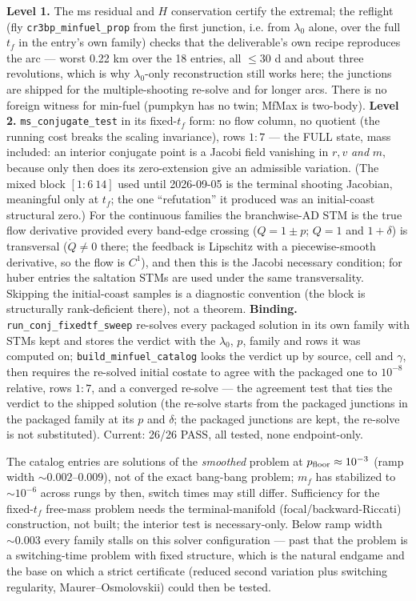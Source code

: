 \documentclass[11pt]{article}
\newcommand{\tf}{t_f}\newcommand{\R}{\mathbb{R}}
\newcommand{\file}[1]{\texttt{#1}}
\begin{document}
\begin{rig}
\textbf{Level 1.} The ms residual and $H$ conservation certify the extremal;
the reflight (fly \file{cr3bp\_minfuel\_prop} from the first junction, i.e. from $\lambda_0$ alone, over the full $\tf$ in the entry's own family) checks that the deliverable's own recipe reproduces the arc --- worst 0.22 km over the 18 entries, all $\le30$ d and about three revolutions, which is why $\lambda_0$-only reconstruction still works here; the junctions are shipped for the multiple-shooting re-solve and for longer arcs. There is no foreign witness for min-fuel (pumpkyn has no twin;
MfMax is two-body). \textbf{Level 2.} \file{ms\_conjugate\_test} in its
fixed-$\tf$ form: no flow column, no quotient (the running cost breaks the
scaling invariance), rows $1{:}7$ --- the FULL state, mass included: an interior
conjugate point is a Jacobi field vanishing in $r,v$ \emph{and} $m$, because only
then does its zero-extension give an admissible variation. (The mixed block
$[1{:}6\ 14]$ used until 2026-09-05 is the terminal shooting Jacobian, meaningful
only at $\tf$; the one ``refutation'' it produced was an initial-coast
structural zero.) For the continuous families the branchwise-AD STM is the
true flow derivative provided every band-edge crossing ($Q=1\pm p$; $Q=1$ and $1+\delta$) is transversal ($\dot Q\neq0$ there; the feedback is Lipschitz with a piecewise-smooth derivative, so the flow is $C^1$), and then this is the Jacobi necessary condition; for huber entries the saltation STMs are used under the same transversality. Skipping the initial-coast samples is a diagnostic convention (the block is structurally rank-deficient there), not a theorem.
\textbf{Binding.} \file{run\_conj\_fixedtf\_sweep} re-solves every packaged
solution in its own family with STMs kept and stores the verdict with the
$\lambda_0$, $p$, family and rows it was computed on; \file{build\_minfuel\_catalog} looks the verdict up by source, cell and $\gamma$, then requires the re-solved initial costate to agree with the packaged one to $10^{-8}$ relative, rows $1{:}7$, and a converged re-solve --- the agreement test that ties the verdict to the shipped solution (the re-solve starts from the packaged junctions in the packaged family at its $p$ and $\delta$; the packaged junctions are kept, the re-solve is not substituted). Current: 26/26 PASS, all
tested, none endpoint-only.
\end{rig}
\begin{warn}
The catalog entries are solutions of the \emph{smoothed} problem at
$p_{\rm floor}\approx10^{-3}$ (ramp width $\sim0.002$--$0.009$), not of the exact
bang-bang problem; $m_f$ has stabilized to $\sim10^{-6}$ across rungs by then, switch times
may still differ. Sufficiency for the fixed-$\tf$ free-mass problem needs the
terminal-manifold (focal/backward-Riccati) construction, not built; the
interior test is necessary-only. Below ramp width $\sim0.003$ every family
stalls on this solver configuration --- past that the problem is a
switching-time problem with fixed structure, which is the natural endgame and the base on which a strict certificate (reduced second variation plus switching regularity, Maurer--Osmolovskii) could then be tested.
\end{warn}
\end{document}
